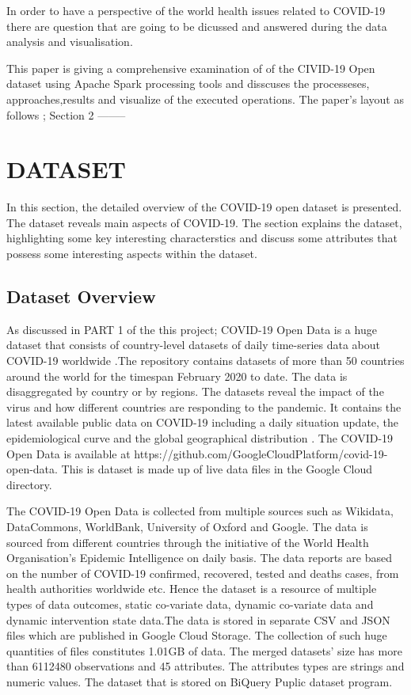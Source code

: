 \documentclass[12pt,letterpaper, twoside]{article}
\begin{document}
 In order to  have a perspective of the world health issues related to COVID-19 there are question that are going to be dicussed and answered during the data analysis and visualisation.
 
 This paper is giving a comprehensive examination of of the CIVID-19 Open dataset using Apache Spark processing tools and disscuses the processeses, approaches,results and visualize of the executed operations. The paper's layout as follows ; Section 2 --------

\section{DATASET}
 In this  section, the detailed overview of the COVID-19 open dataset is presented. The dataset reveals main aspects of COVID-19. The section explains the dataset, highlighting some key interesting characterstics and discuss some attributes that possess some interesting aspects  within the dataset.

\subsection{Dataset Overview}

 As discussed in PART 1 of the this project;  COVID-19 Open Data is a huge dataset that consists of country-level datasets of daily time-series data about COVID-19 worldwide \cite{covid-19}.The repository contains datasets of more than 50 countries around the world for the timespan February 2020 to date. The data is disaggregated  by country or by regions. The datasets reveal the impact of the virus and how different countries are responding to the pandemic.  It contains the latest available public data on COVID-19 including a daily situation update, the epidemiological curve and the global geographical distribution \cite{covid-19}. The COVID-19 Open Data is available at https://github.com/GoogleCloudPlatform/covid-19-open-data. This is dataset is made up of live data files in the Google Cloud directory.

The COVID-19 Open Data is collected from multiple sources such as Wikidata, DataCommons, WorldBank, University of Oxford and Google. The data is sourced from different countries through the initiative of the World Health Organisation's Epidemic Intelligence on daily basis. The data reports are based on the number of COVID-19  confirmed, recovered, tested and deaths cases, from health authorities worldwide etc. Hence the dataset is a resource of multiple types of data outcomes, static co-variate data, dynamic co-variate data and dynamic intervention state data\cite{covid-19}.The data is stored in separate CSV and JSON files which are published in Google Cloud Storage. The collection of such huge quantities of files constitutes 1.01GB of data.  The merged datasets' size has  more than 6112480 observations and 45 attributes.  The attributes types are strings and numeric values. The dataset that is stored on BiQuery Puplic dataset program.
\end{document}
